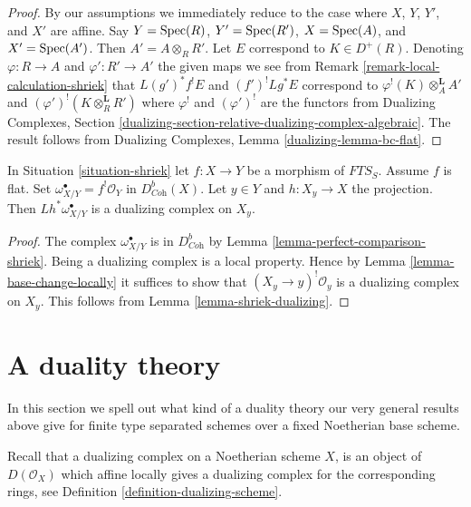 \begin{proof}
By our assumptions we immediately reduce to the case where
$X$, $Y$, $Y'$, and $X'$ are affine.
Say $Y = \mathop{\mathrm{Spec}}(R)$, $Y' = \mathop{\mathrm{Spec}}(R')$, $X = \mathop{\mathrm{Spec}}(A)$, and $X' = \mathop{\mathrm{Spec}}(A')$.
Then $A' = A \otimes_R R'$. Let
$E$ correspond to $K \in D^+(R)$.
Denoting $\varphi : R \to A$ and $\varphi' : R' \to A'$
the given maps we see from
Remark \ref{remark-local-calculation-shriek}
that $L(g')^*f^!E$ and $(f')^!Lg^*E$ correspond to
$\varphi^!(K) \otimes_A^\mathbf{L} A'$ and
$(\varphi')^!(K \otimes_R^\mathbf{L} R')$
where $\varphi^!$ and $(\varphi')^!$ are the functors from
Dualizing Complexes, Section
\ref{dualizing-section-relative-dualizing-complex-algebraic}.
The result follows from
Dualizing Complexes, Lemma \ref{dualizing-lemma-bc-flat}.
\end{proof}

\begin{lemma}
\label{lemma-relative-dualizing-fibres}
In Situation \ref{situation-shriek} let $f : X \to Y$ be a morphism of
$\textit{FTS}_S$. Assume $f$ is flat. Set
$\omega_{X/Y}^\bullet = f^!\mathcal{O}_Y$ in $D^b_{\textit{Coh}}(X)$.
Let $y \in Y$ and $h : X_y \to X$ the projection.
Then $Lh^*\omega_{X/Y}^\bullet$ is a dualizing complex
on $X_y$.
\end{lemma}

\begin{proof}
The complex $\omega_{X/Y}^\bullet$ is in $D^b_{\textit{Coh}}$
by Lemma \ref{lemma-perfect-comparison-shriek}.
Being a dualizing complex is a local property.
Hence by Lemma \ref{lemma-base-change-locally}
it suffices to show that $(X_y \to y)^!\mathcal{O}_y$
is a dualizing complex on $X_y$.
This follows from Lemma \ref{lemma-shriek-dualizing}.
\end{proof}








\section{A duality theory}
\label{section-duality}

\noindent
In this section we spell out what kind of a duality theory our very general
results above give for finite type separated schemes over a fixed
Noetherian base scheme.

\medskip\noindent
Recall that a dualizing complex on a Noetherian scheme $X$, is an
object of $D(\mathcal{O}_X)$ which affine locally gives a dualizing
complex for the corresponding rings, see
Definition \ref{definition-dualizing-scheme}.

